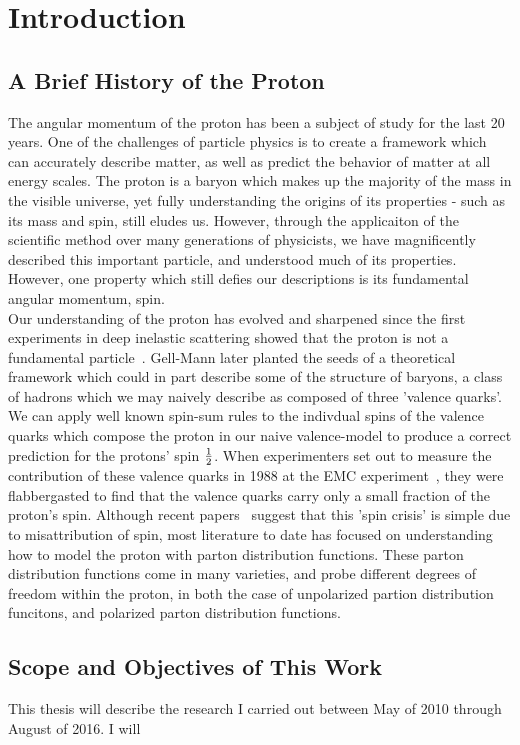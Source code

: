 \chapter{Introduction}

\section{A Brief History of the Proton}
The angular momentum of the proton has been a subject of study for the last 20
years\needcite{}. One of the challenges of particle physics is to create a
framework which can accurately describe matter, as well as predict the behavior
of matter at all energy scales. The proton is a baryon which makes up the
majority of the mass in the visible universe, yet fully understanding the
origins of its properties - such as its mass and spin, still eludes us. However,
through the applicaiton of the scientific method over many generations of
physicists, we have magnificently described this important particle, and
understood much of its properties. However, one property which still defies our
descriptions is its fundamental angular momentum, spin. \\
	
Our understanding of the proton has evolved and sharpened since the first
experiments in deep inelastic scattering showed that the proton is not a
fundamental particle~\cite{PhysRevLett.23.930}. Gell-Mann later planted the
seeds of a theoretical framework which could in part describe some of the
structure of baryons, a class of hadrons which we may naively describe as
composed of three 'valence quarks'\needcite{}. We can apply well known spin-sum
rules to the indivdual spins of the valence quarks which compose the proton in
our naive valence-model to produce a correct prediction for the protons' spin
${1}\over{2}$. When experimenters set out to measure the contribution of these
valence quarks in 1988 at the EMC experiment~\cite{1988PhLB..206..364A}, they
were flabbergasted to find that the valence quarks carry only a small fraction
of the proton's spin. Although recent papers~\cite{1603.05884} suggest that this 'spin
crisis' is simple due to misattribution of spin, most literature to date has
focused on understanding how to model the proton with parton distribution
functions. These parton distribution functions come in many varieties, and probe
different degrees of freedom within the proton, in both the case of unpolarized
partion distribution funcitons, and polarized parton distribution functions. \\
 
\section{Scope and Objectives of This Work}
This thesis will describe the research I carried out between May of 2010 through
August of 2016. I will 

